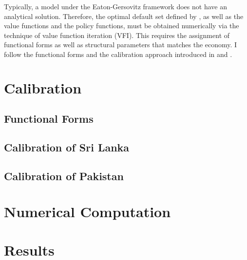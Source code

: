 Typically, a model under the Eaton-Gersovitz framework does not have an analytical solution. Therefore, the optimal default set defined by , as well as the value functions and the policy functions, must be obtained numerically via the technique of value function iteration (VFI).
This requires the assignment of functional forms as well as structural parameters that matches the economy.
I follow the functional forms and the calibration approach introduced in \citet{Na-18} and \citet{Hinrichsen_2020-chapter4}.

\section{Calibration}

\subsection*{Functional Forms}


\subsection*{Calibration of Sri Lanka}


\subsection*{Calibration of Pakistan}


\section{Numerical Computation}
\label{sec:computation}


\section{Results}